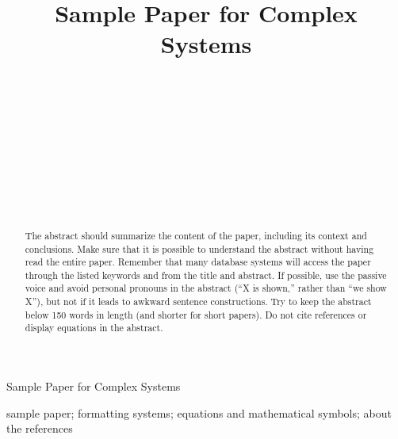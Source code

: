 \documentclass{article}
\begin{document}
\title{Sample Paper for Complex Systems%
%
}

\author{\\[2pt] 
\\
\\
\\
\and
\\
\\[2pt]
\\
\\
}

%
%
{Sample Paper for Complex Systems} 

\maketitle

\begin{abstract}
The abstract should summarize the content of the paper, including its context and conclusions. Make sure that it is possible to understand
the abstract without having read the entire paper. Remember that many database systems will access the paper through the listed keywords and from
the title and abstract. If possible, use the passive voice and avoid personal pronouns in the abstract ({``}X is shown,{''} rather than {``}we show
X{''}), but not if it leads to awkward sentence constructions. Try to keep the abstract below 150 words in length (and shorter for short papers).
Do not cite references or display equations in the abstract.
\end{abstract}

\begin{keywords}
sample paper; formatting systems; equations and mathematical symbols; about the references
\end{keywords}
\end{document}

